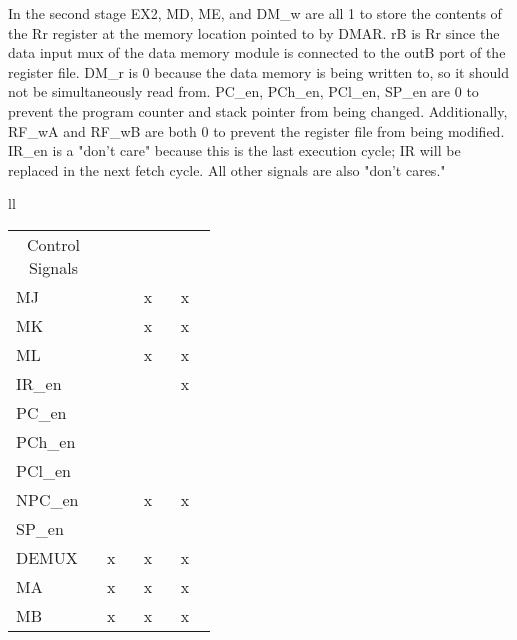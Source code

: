 \documentclass[11pt]{article}
\begin{document}
\begin{enumerate}[leftmargin=0.2in]
\begin{enumerate}
      In the second stage EX2, MD, ME, and DM\_w are all 1 to store the contents of the Rr register at the memory location pointed to by DMAR. rB is Rr since the data input mux of the data memory module is connected to the outB port of the register file. DM\_r is 0 because the data memory is being written to, so it should not be simultaneously read from. PC\_en, PCh\_en, PCl\_en, SP\_en are 0 to prevent the program counter and stack pointer from being changed. Additionally, RF\_wA and RF\_wB are both 0 to prevent the register file from being modified. IR\_en is a "don't care" because this is the last execution cycle; IR will be replaced in the next fetch cycle. All other signals are also "don't cares."
      \begin{table}[H]
        \centering
        \begin{tabular}{ll}
          \begin{tabular}{|p{0.1\linewidth}|>{\centering\arraybackslash}p{0.1\linewidth}|>{\centering\arraybackslash}p{0.1\linewidth}|>{\centering\arraybackslash}p{0.1\linewidth}|}\hline
            \multicolumn{1}{|c|}{\multirow{2}{0.1\linewidth}{Control Signals}} & \multicolumn{1}{c|}{\multirow{2}{*}{IF}} & \multicolumn{2}{c|}{\texttt{STD Y+q, Rr}} \\ \cline{3-4} 
            \multicolumn{1}{|c|}{} & \multicolumn{1}{c|}{} & \multicolumn{1}{c|}{EX1} & \multicolumn{1}{c|}{EX2} \\ \hhline{|=|=|=|=|}
            MJ        & 0     & x     & x     \\ \hline
            MK        & 0     & x     & x     \\ \hline
            ML        & 0     & x     & x     \\ \hline
            IR\_en    & 1     & 0     & x     \\ \hline
            PC\_en    & 1     & 0     & 0     \\ \hline
            PCh\_en   & 0     & 0     & 0     \\ \hline
            PCl\_en   & 0     & 0     & 0     \\ \hline
            NPC\_en   & 1     & x     & x     \\ \hline
            SP\_en    & 0     & 0     & 0     \\ \hline
            DEMUX     & x     & x     & x     \\ \hhline{|=|=|=|=|}
            MA        & x     & x     & x     \\ \hline
            MB        & x     & x     & x     \\ \hline

\end{tabular}
\end{tabular}
\end{table}
\end{enumerate}
\end{enumerate}
\end{document}
